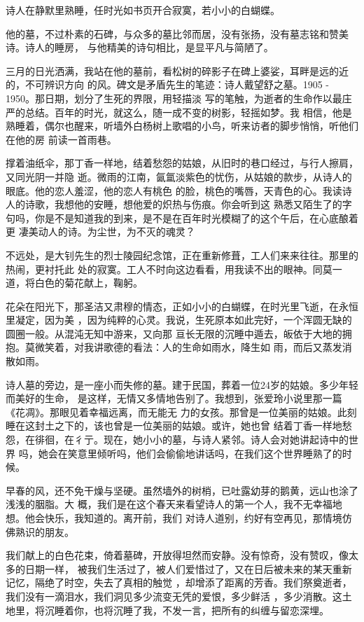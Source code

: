 \documentclass[12pt,a4paper]{article}
\begin{document}
	\endwriting



		诗人在静默里熟睡，任时光如书页开合寂寞，若小小的白蝴蝶。

		他的墓，不过朴素的石碑，与众多的墓比邻而居，没有张扬，没有墓志铭和赞美诗。诗人的睡房，
	与他精美的诗句相比，是显平凡与简陋了。


		三月的日光洒满，我站在他的墓前，看松树的碎影子在碑上婆娑，耳畔是远的近的，不可辨识方向
	的风。碑文是矛盾先生的笔迹：诗人戴望舒之墓。1905 - 1950。那日期，划分了生死的界限，用轻描淡
	写的笔触，为逝者的生命作以最庄严的总结。百年的时光，就这么，随一成不变的树影，轻摇如梦。我
	相信，他是熟睡着，偶尔也醒来，听墙外白杨树上歌唱的小鸟，听来访者的脚步悄悄，听他们在他的房
	前读一首雨巷。


		撑着油纸伞，那丁香一样地，结着愁怨的姑娘，从旧时的巷口经过，与行人擦肩，又同光阴一并隐
	逝。微雨的江南，氤氲淡紫色的忧伤，从姑娘的款步，从诗人的眼底。他的恋人羞涩，他的恋人有桃色
	的脸，桃色的嘴唇，天青色的心。我读诗人的诗歌，我想他的安睡，想他爱的炽热与伤痕。你会听到这
	熟悉又陌生了的字句吗，你是不是知道我的到来，是不是在百年时光模糊了的这个午后，在心底酿着更
	凄美动人的诗。为尘世，为不灭的魂灵？


		不远处，是大钊先生的烈士陵园纪念馆，正在重新修葺，工人们来来往往。那里的热闹，更衬托此
	处的寂寞。工人不时向这边看看，用我读不出的眼神。同莫一道，将白色的菊花献上，鞠躬。


		花朵在阳光下，那圣洁又肃穆的情态，正如小小的白蝴蝶，在时光里飞逝，在永恒里凝定，因为美
	，因为纯粹的心灵。我说，生死原本如此完好，一个浑圆无缺的圆圈一般。从混沌无知中游来，又向那
	亘长无限的沉睡中遁去，皈依于大地的拥抱。莫微笑着，对我讲歌德的看法：人的生命如雨水，降生如
	雨，而后又蒸发消散如雨。


		诗人墓的旁边，是一座小而失修的墓。建于民国，葬着一位24岁的姑娘。多少年轻而美好的生命，
	是这样，无情又多情地告别了。我想到，张爱玲小说里那一篇《花凋》。那眼见着幸福远离，而无能无
	力的女孩。那曾是一位美丽的姑娘。此刻睡在这封土之下的，该也曾是一位美丽的姑娘。或许，她也曾
	结着丁香一样地愁怨，在徘徊，在彳亍。现在，她小小的墓，与诗人紧邻。诗人会对她讲起诗中的世界
	吗，她会在笑意里倾听吗，他们会偷偷地讲话吗，在我们这个世界睡熟了的时候。


		早春的风，还不免干燥与坚硬。虽然墙外的树梢，已吐露幼芽的鹅黄，远山也涂了浅浅的胭脂。大
	概，我们是在这个春天来看望诗人的第一个人，我不无幸福地想。他会快乐，我知道的。离开前，我们
	对诗人道别，约好有空再见，那情境仿佛熟识的朋友。


		我们献上的白色花束，倚着墓碑，开放得坦然而安静。没有惊奇，没有赞叹，像太多的日期一样，
	被我们生活过了，被人们爱惜过了，又在日后被未来的某天重新记忆，隔绝了时空，失去了真相的触觉
	，却增添了距离的芳香。我们祭奠逝者，我们没有一滴泪水，我们洞见多少流变无凭的爱恨，多少鲜活
	，多少消散。这土地里，将沉睡着你，也将沉睡了我，不发一言，把所有的纠缠与留恋深埋。
\end{document}
